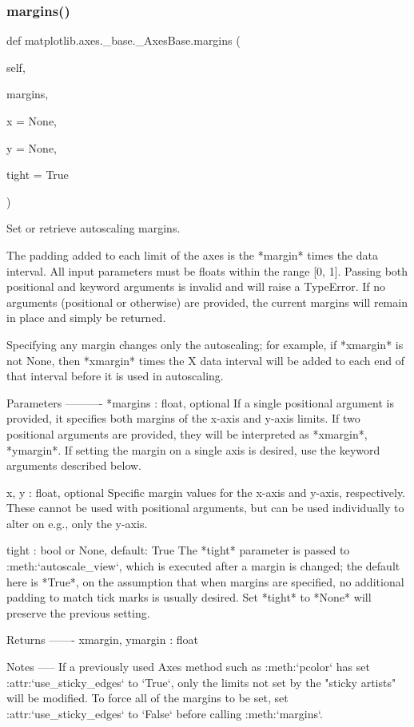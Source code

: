 \subsubsection{\texorpdfstring{margins()}{margins()}}
{\footnotesize\ttfamily def matplotlib.\+axes.\+\_\+base.\+\_\+\+Axes\+Base.\+margins (\begin{DoxyParamCaption}\item[{}]{self,  }\item[{}]{margins,  }\item[{}]{x = {\ttfamily None},  }\item[{}]{y = {\ttfamily None},  }\item[{}]{tight = {\ttfamily True} }\end{DoxyParamCaption})}

\begin{DoxyVerb}Set or retrieve autoscaling margins.

The padding added to each limit of the axes is the *margin*
times the data interval. All input parameters must be floats
within the range [0, 1]. Passing both positional and keyword
arguments is invalid and will raise a TypeError. If no
arguments (positional or otherwise) are provided, the current
margins will remain in place and simply be returned.

Specifying any margin changes only the autoscaling; for example,
if *xmargin* is not None, then *xmargin* times the X data
interval will be added to each end of that interval before
it is used in autoscaling.

Parameters
----------
*margins : float, optional
    If a single positional argument is provided, it specifies
    both margins of the x-axis and y-axis limits. If two
    positional arguments are provided, they will be interpreted
    as *xmargin*, *ymargin*. If setting the margin on a single
    axis is desired, use the keyword arguments described below.

x, y : float, optional
    Specific margin values for the x-axis and y-axis,
    respectively. These cannot be used with positional
    arguments, but can be used individually to alter on e.g.,
    only the y-axis.

tight : bool or None, default: True
    The *tight* parameter is passed to :meth:`autoscale_view`,
    which is executed after a margin is changed; the default
    here is *True*, on the assumption that when margins are
    specified, no additional padding to match tick marks is
    usually desired.  Set *tight* to *None* will preserve
    the previous setting.

Returns
-------
xmargin, ymargin : float

Notes
-----
If a previously used Axes method such as :meth:`pcolor` has set
:attr:`use_sticky_edges` to `True`, only the limits not set by
the "sticky artists" will be modified. To force all of the
margins to be set, set :attr:`use_sticky_edges` to `False`
before calling :meth:`margins`.
\end{DoxyVerb}
